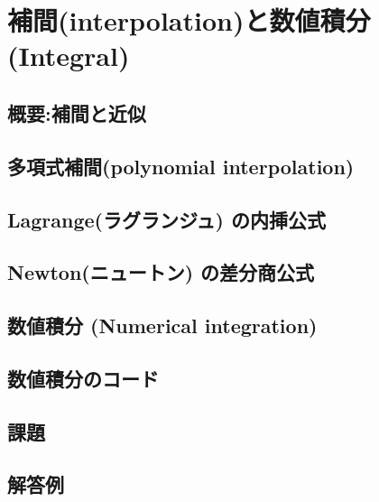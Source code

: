 \documentclass[10pt,a4j]{jreport}
\begin{document}
\chapter{補間(interpolation)と数値積分(Integral)}
\section{概要:補間と近似}

\section{多項式補間(polynomial interpolation)}

\section{Lagrange(ラグランジュ) の内挿公式}

\section{Newton(ニュートン) の差分商公式}

\section{数値積分 (Numerical integration)}

\section{数値積分のコード}

\section{課題}

\section{解答例}

\end{document}
